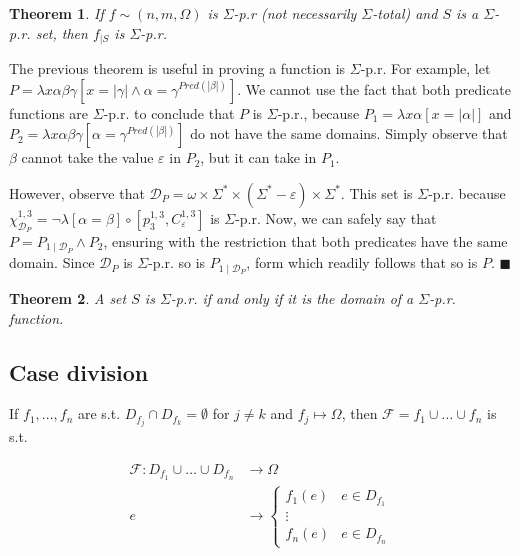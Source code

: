 \documentclass[a4paper, 12pt]{article}
\newtheorem{theorem}{Theorem}
\newtheorem{theorem}{Theorem}
\begin{document}
\begin{theorem}
    If $f \sim (n, m, \Omega)$ is $\Sigma$-p.r (not necessarily $\Sigma$-total) and $S$ is a $\Sigma$-p.r. set,
    then $f_{\mid S}$ is $\Sigma$-p.r. 
\end{theorem}

The previous theorem is useful in proving a function is $\Sigma$-p.r. For
example, let $P = \lambda x\alpha\beta \gamma \left[  x = |\gamma| \land \alpha
= \gamma^{Pred(|\beta|)}\right] $. We cannot use the fact that both predicate
functions are $\Sigma$-p.r. to conclude that $P$ is $\Sigma$-p.r., because $P_1
= \lambda x\alpha [x = |\alpha|]$ and $P_2 = \lambda x \alpha \beta \gamma
[\alpha =
\gamma^{Pred(|\beta|)}]$ do not have the same domains. Simply observe that
$\beta$ cannot take the value $\varepsilon$ in $P_2$, but it can take in $P_1$.


However, observe that $\mathcal{D}_P = \omega \times \Sigma^{*} \times
(\Sigma^{*} - \varepsilon) \times \Sigma^{*} $. This set is $\Sigma$-p.r. because
$\chi_{\mathcal{D}_P}^{1, 3} = \neg \lambda \left[ \alpha = \beta \right] \circ
\left[ p_{3}^{1, 3}, C_{\varepsilon}^{1, 3} \right]$ is $\Sigma$-p.r. Now, we can
safely say that $P = P_{1\mid \mathcal{D}_P} \land P_2$, ensuring with the
restriction that both predicates have the same domain. Since $\mathcal{D}_P$ is
$\Sigma$-p.r. so is $P_{1\mid \mathcal{D}_P}$, form which readily follows that
so is $P$. $\blacksquare$

\begin{theorem}
    A set $S$ is $\Sigma$-p.r. if and only if it is the domain of a
    $\Sigma$-p.r. function.
\end{theorem}

\subsection{Case division}

If $f_1, \ldots, f_n$ are s.t. $D_{f_j} \cap D_{f_k} = \emptyset$ for $j \neq k$
and $f_j \mapsto \Omega$, then $\mathcal{F} = f_1 \cup \ldots \cup f_n$ is s.t. 

\begin{align*}
    \mathcal{F} : D_{f_1} \cup \ldots \cup D_{f_n} &\to \Omega \\
    e &\to \begin{cases}
        f_1(e) & e \in D_{f_1} \\ 
               \vdots \\ 
        f_n(e) & e \in D_{f_n}
    \end{cases}
\end{align*}
\end{document}
